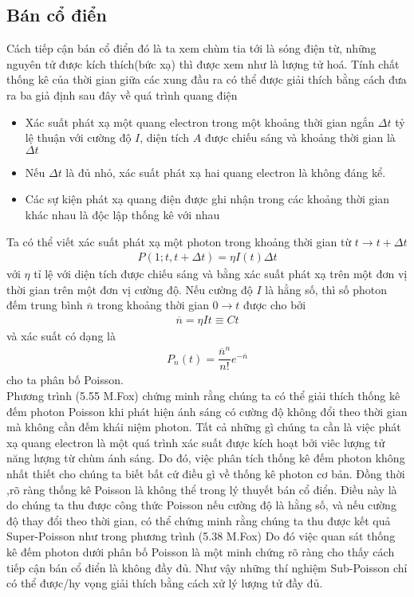 \documentclass{report}
\newcommand{\f}[2]{\dfrac{#1}{#2}}
\begin{document}
\subsection{Bán cổ điển}
Cách tiếp cận bán cổ điển đó là ta xem chùm tia tới là sóng điện từ, những nguyên tử được kích thích(bức xạ) thì được xem như là lượng tử hoá. Tính chất thống kê của thời gian giữa các xung đầu ra có thể được giải thích bằng cách đưa ra ba giả định sau đây về quá trình quang điện
\begin{itemize}
	\item Xác suất phát xạ một quang electron trong một khoảng thời gian ngắn $\Delta t$ tỷ lệ thuận với cường độ $I$, diện tích $A$ được chiếu sáng và khoảng thời gian là $\Delta t$
	\item Nếu $\Delta t$ là đủ nhỏ, xác suất phát xạ hai quang electron là không đáng kể.
	\item Các sự kiện phát xạ quang điện được ghi nhận trong các khoảng thời gian khác nhau là độc lập thống kê với nhau
\end{itemize}
Ta có thể viết xác suất phát xạ một photon trong khoảng thời gian từ $t \rightarrow t + \Delta t$
\begin{gather}
	P(1;t,t + \Delta t) = \eta I(t) \Delta t
\end{gather}
với $\eta$ tỉ lệ với diện tích được chiếu sáng và bằng xác suất phát xạ trên một đơn vị thời gian trên một đơn vị cường độ. Nếu cường độ $I$ là hằng số, thì số photon đếm trung bình $\overline{n}$ trong khoảng thời gian $0 \rightarrow t$ được cho bởi 
\begin{gather}
	\overline{n} = \eta I t \equiv Ct
\end{gather}
và xác suất có dạng là
\begin{gather}
	P_{n} (t) = \f{\overline{n}^{n}}{n!} e^{- \overline{n}}
\end{gather}
cho ta phân bố Poisson.\\
Phương trình (5.55 M.Fox) chứng minh rằng chúng ta có thể giải thích thống kê đếm photon Poisson khi phát hiện ánh sáng có cường độ không đổi theo thời gian mà không cần đếm khái niệm photon. Tất cả những gì chúng ta cần là việc phát xạ quang electron là một quá trình xác suất được kích hoạt bởi viêc lượng tử năng lượng từ chùm ánh sáng. Do đó, việc phân tích thống kê đếm photon không nhất thiết cho chúng ta biết bất cứ điều gì về thống kê photon cơ bản. Đồng thời ,rõ ràng thống kê Poisson là không thể trong lý thuyết bán cổ điển. Điều này là do chúng ta thu được công thức Poisson nếu cường độ là hằng số, và nếu cường độ thay đổi theo thời gian, có thể chứng minh rằng chúng ta thu được kết quả Super-Poisson như trong phương trình (5.38 M.Fox) Do đó việc quan sát thống kê đếm photon dưới phân bố Poisson là một minh chứng rõ ràng cho thấy cách tiếp cận bán cổ điển là không đầy đủ. Như vậy những thí nghiệm Sub-Poisson chỉ có thể được/hy vọng giải thích bằng cách xử lý lượng tử đầy đủ.
\end{document}
